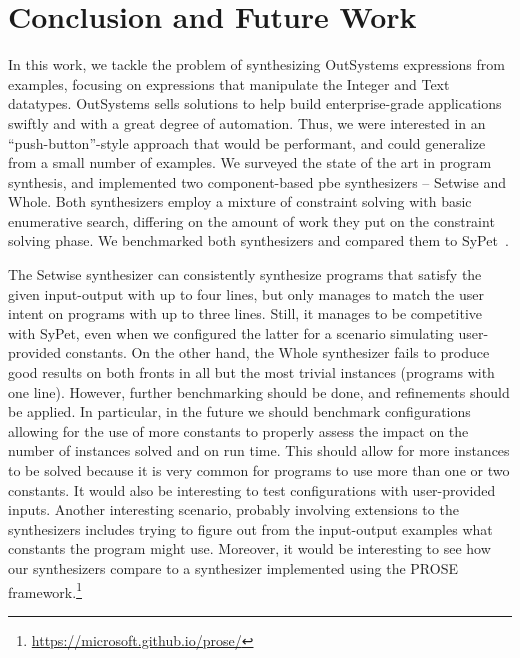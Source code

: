 \section{Conclusion and Future Work}
\label{sec:conclusion}

In this work, we tackle the problem of synthesizing OutSystems expressions from
examples, focusing on expressions that manipulate the Integer and Text
datatypes.
OutSystems sells solutions to help build enterprise-grade applications swiftly
and with a great degree of automation.
Thus, we were interested in an ``push-button''-style approach that would be
performant, and could generalize from a small number of examples.
We surveyed the state of the art in program synthesis, and implemented two
component-based \gls{pbe} synthesizers -- Setwise and Whole.
Both synthesizers employ a mixture of constraint solving with basic enumerative
search, differing on the amount of work they put on the constraint solving
phase.
We benchmarked both synthesizers and compared them to SyPet~\cite{Feng:2017:CSC}.

The Setwise synthesizer can consistently synthesize programs that satisfy the
given input-output with up to four lines, but only manages to match the user
intent on programs with up to three lines.
Still, it manages to be competitive with SyPet, even when we configured the
latter for a scenario simulating user-provided constants.
On the other hand, the Whole synthesizer fails to produce good results on both
fronts in all but the most trivial instances (programs with one line).
However, further benchmarking should be done, and refinements should be applied.
In particular, in the future we should benchmark configurations allowing for the
use of more constants to properly assess the impact on the number of instances
solved and on run time.
This should allow for more instances to be solved because it is very common for
programs to use more than one or two constants.
It would also be interesting to test configurations with user-provided inputs.
Another interesting scenario, probably involving extensions to the synthesizers
includes trying to figure out from the input-output examples what constants the
program might use.
Moreover, it would be interesting to see how our synthesizers compare to a
synthesizer implemented using the PROSE
framework.\footnote{\url{https://microsoft.github.io/prose/}}

